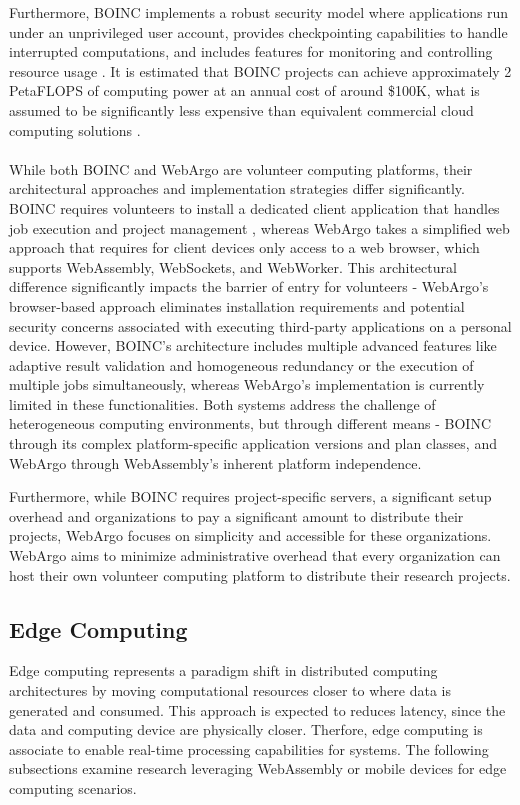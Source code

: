 Furthermore, \ac{BOINC} implements a robust security model where applications run under an unprivileged user account, provides checkpointing capabilities to handle interrupted computations, and includes features for monitoring and controlling resource usage \cite{relatedwork:boinc1}. It is estimated that \ac{BOINC} projects can achieve approximately 2 Peta\ac{FLOPS} of computing power at an annual cost of around \$100K, what is assumed to be significantly less expensive than equivalent commercial cloud computing solutions  \cite{relatedwork:boinc1}.
\\~\\
While both \ac{BOINC} and WebArgo are volunteer computing platforms, their architectural approaches and implementation strategies differ significantly. \ac{BOINC} requires volunteers to install a dedicated client application that handles job execution and project management \cite{relatedwork:boinc1}, whereas WebArgo takes a simplified web approach that requires for client devices only access to a web browser, which supports WebAssembly, WebSockets, and WebWorker. This architectural difference significantly impacts the barrier of entry for volunteers - WebArgo's browser-based approach eliminates installation requirements and potential security concerns associated with executing third-party applications on a personal device. However, \ac{BOINC}'s architecture includes multiple advanced features like adaptive result validation and homogeneous redundancy or the execution of multiple jobs simultaneously, whereas WebArgo's implementation is currently limited in these functionalities. Both systems address the challenge of heterogeneous computing environments, but through different means - \ac{BOINC} through its complex platform-specific application versions and plan classes, and WebArgo through WebAssembly's inherent platform independence.

Furthermore, while \ac{BOINC} requires project-specific servers, a significant setup overhead and organizations to pay a significant amount to distribute their projects, WebArgo focuses on simplicity and accessible for these organizations. WebArgo aims to minimize administrative overhead that every organization can host their own volunteer computing platform to distribute their research projects.

\subsection{Edge Computing}
Edge computing represents a paradigm shift in distributed computing architectures by moving computational resources closer to where data is generated and consumed. This approach is expected to reduces latency, since the data and computing device are physically closer. Therfore, edge computing is associate to enable real-time processing capabilities for systems. The following subsections examine research leveraging WebAssembly or mobile devices for edge computing scenarios.

